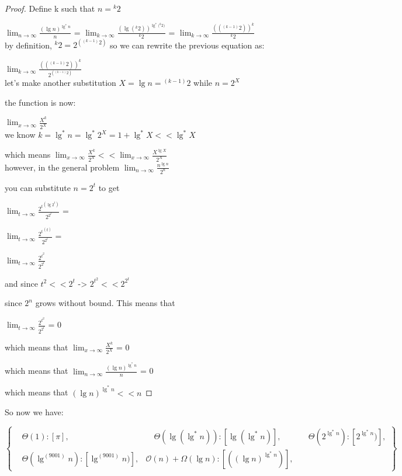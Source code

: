 \documentclass[11pt,fleqn]{article}
\theoremstyle{definition}
\theoremstyle{remark}
\begin{document}
\begin{proof} Define k such that $n = {}^k 2$
    
    $\lim_{n \to \infty} \frac{{(\lg n)}^{\lg^*{n}}}{n}$ =
    $\lim_{k \to \infty} \frac{{(\lg{({}^k 2)})}^{\lg^*{({}^k 2})}}{{}^k 2}$ =
    $\lim_{k \to \infty} \frac{{({({}^{(k-1)} 2)})}^{k}}{{}^k 2}$\\

    by definition, ${}^k 2 = 2^{({}^{(k-1)} 2)}$ so we can rewrite the 
    previous equation as:

    $\lim_{k \to \infty} \frac{{({({}^{(k-1)} 2)})}^{k}}{2^{({}^{(k-1)} 2)}}$\\

    let's make another substitution $X = \lg n = {}^{(k-1)} 2$ while $n = 2^X$

    the function is now:

    $\lim_{x \to \infty} \frac{{X}^{k}}{2^{X}}$\\

    we know $k = \lg^*n = \lg^*{2^X} = 1 + \lg^*X << \lg^*X$

    which means $\lim_{x \to \infty} \frac{{X}^{k}}{2^{X}} << \lim_{x \to \infty} \frac{{X}^{\lg{X}}}{2^{X}}$\\

    however, in the general problem $\lim_{n \to \infty} \frac{n^{\lg{n}}}{2^n}$
    
    you can substitute $n = 2^t$ to get

    $\lim_{t \to \infty} \frac{{2^t}^{(\lg{2^t})}}{2^{2^t}}$ =
    
    $\lim_{t \to \infty} \frac{{2^t}^{(t)}}{2^{2^t}}$ =

    $\lim_{t \to \infty} \frac{{2^{t^2}}}{2^{2^t}}$ 

    and since $t^2 << 2^t$ -> ${2^{t^2}} << 2^{2^t}$

    since $2^n$ grows without bound. This means that 
    
    $\lim_{t \to \infty} \frac{{2^{t^2}}}{2^{2^t}}$ = 0

    which means that $\lim_{x \to \infty} \frac{{X}^{k}}{2^{X}}$ = 0

    which means that $\lim_{n \to \infty} \frac{{(\lg n)}^{\lg^*{n}}}{n}$ = 0

    which means that ${(\lg n)}^{\lg^*{n}} << n$

    \end{proof}

So now we have:

\[
\left\{
\begin{aligned}
& \Theta(1): [\pi],
& \quad \Theta(\lg(\lg^*n)): [\lg(\lg^*n)],
& \quad \Theta(2^{\lg^*n}): [2^{\lg^*n})],\\
& \Theta(\lg^{(9001)} n): [\lg^{(9001)} n)],
& \mathcal{O}(n)+\Omega(\lg n): [({(\lg n)}^{\lg^*{n}})],
\end{aligned}
\right\}
\]\\
\end{document}
